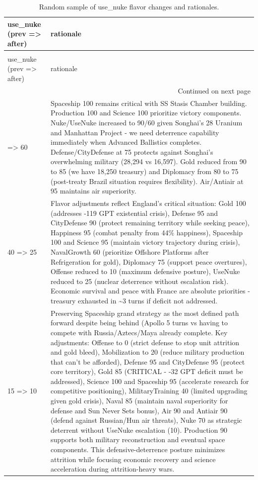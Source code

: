 \begin{longtable}{p{}p{}}
\caption{Random sample of use_nuke flavor changes and rationales.} \label{tab:use-nuke-change-rationales} \\
\toprule
use\_nuke (prev => after) & rationale \\
\midrule
\endfirsthead
\caption[]{Random sample of use_nuke flavor changes and rationales.} \\
\toprule
use\_nuke (prev => after) & rationale \\
\midrule
\endhead
\midrule
\multicolumn{2}{r}{Continued on next page} \\
\midrule
\endfoot
\bottomrule
\endlastfoot
55 => 60 & Spaceship 100 remains critical with SS Stasis Chamber building. Production 100 and Science 100 prioritize victory components. Nuke/UseNuke increased to 90/60 given Songhai's 28 Uranium and Manhattan Project - we need deterrence capability immediately when Advanced Ballistics completes. Defense/CityDefense at 75 protects against Songhai's overwhelming military (28,294 vs 16,597). Gold reduced from 90 to 85 (we have 18,250 treasury) and Diplomacy from 80 to 75 (post-treaty Brazil situation requires flexibility). Air/Antiair at 95 maintains air superiority. \\
40 => 25 & Flavor adjustments reflect England's critical situation: Gold 100 (addresses -119 GPT existential crisis), Defense 95 and CityDefense 90 (protect remaining territory while seeking peace), Happiness 95 (combat penalty from 44\% happiness), Spaceship 100 and Science 95 (maintain victory trajectory during crisis), NavalGrowth 60 (prioritize Offshore Platforms after Refrigeration for gold), Diplomacy 75 (support peace overtures), Offense reduced to 10 (maximum defensive posture), UseNuke reduced to 25 (nuclear deterrence without escalation risk). Economic survival and peace with France are absolute priorities - treasury exhausted in \textasciitilde 3 turns if deficit not addressed. \\
15 => 10 & Preserving Spaceship grand strategy as the most defined path forward despite being behind (Apollo 5 turns vs having to compete with Russia/Aztecs/Maya already complete. Key adjustments: Offense to 0 (strict defense to stop unit attrition and gold bleed), Mobilization to 20 (reduce military production that can't be afforded), Defense 95 and CityDefense 95 (protect core territory), Gold 85 (CRITICAL - -32 GPT deficit must be addressed), Science 100 and Spaceship 95 (accelerate research for competitive positioning), MilitaryTraining 40 (limited upgrading given gold crisis), Naval 85 (maintain naval superiority for defense and Sun Never Sets bonus), Air 90 and Antiair 90 (defend against Russian/Hun air threats), Nuke 70 as strategic deterrent without UseNuke escalation (10). Production 90 supports both military reconstruction and eventual space components. This defensive-deterrence posture minimizes attrition while focusing economic recovery and science acceleration during attrition-heavy wars. \\

\end{longtable}
